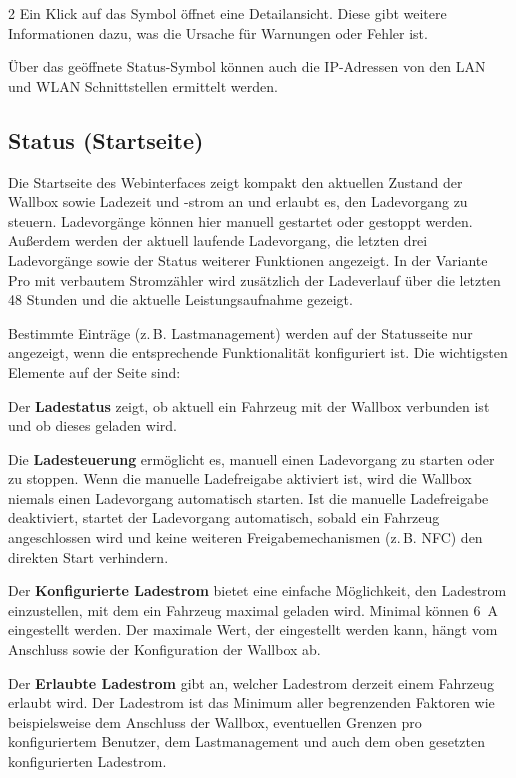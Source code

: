 \documentclass[a4paper,10pt]{article}
\newcommand{\hint}[1]{\begin{tcolorbox}[colback=boxgray,colframe=black,coltext=
white,title=Hinweis,left*=2mm,right*=2mm,boxsep=1mm,bottom=1mm,top=1mm]#1\end{tcolorbox}}
\begin{document}
\begin{multicols*}{2}
	Ein Klick auf das Symbol öffnet eine Detailansicht. Diese gibt weitere
	Informationen dazu, was die Ursache für Warnungen oder Fehler ist.
	\par
	\hint{Über das geöffnete Status-Symbol können auch die IP-Adressen von den LAN und
	WLAN Schnittstellen ermittelt werden.}

    \subsection{Status (Startseite)}

    Die Startseite des Webinterfaces zeigt kompakt den aktuellen Zustand der
    Wallbox sowie Ladezeit und -strom an und erlaubt es, den Ladevorgang zu steuern.
    Ladevorgänge können hier manuell gestartet oder gestoppt werden.
    Außerdem werden der aktuell laufende Ladevorgang, die letzten drei
    Ladevorgänge sowie der Status weiterer Funktionen angezeigt.
    In der Variante Pro mit verbautem Stromzähler wird zusätzlich der Ladeverlauf
    über die letzten 48 Stunden und die aktuelle Leistungsaufnahme gezeigt.

    Bestimmte Einträge (z.\,B. Lastmanagement) werden auf der Statusseite nur angezeigt, wenn die entsprechende
    Funktionalität konfiguriert ist. Die wichtigsten Elemente auf der Seite sind:

    Der \textbf{Ladestatus} zeigt, ob aktuell ein
    Fahrzeug mit der Wallbox verbunden ist und ob dieses geladen wird.

    Die \textbf{Ladesteuerung} ermöglicht es, manuell einen Ladevorgang zu
    starten oder zu stoppen. Wenn die manuelle Ladefreigabe aktiviert ist, wird die
    Wallbox niemals einen Ladevorgang automatisch starten.
    Ist die manuelle Ladefreigabe deaktiviert,
    startet der Ladevorgang automatisch, sobald ein Fahrzeug
    angeschlossen wird und keine weiteren Freigabemechanismen (z.\,B. NFC) den
    direkten Start verhindern.

    Der \textbf{Konfigurierte Ladestrom} bietet eine einfache Möglichkeit, den
	Ladestrom einzustellen, mit dem ein Fahrzeug maximal geladen wird.
	Minimal können \SI{6}{\ampere} eingestellt werden. Der maximale Wert, der eingestellt werden kann, hängt vom Anschluss sowie der Konfiguration der Wallbox ab.

    Der \textbf{Erlaubte Ladestrom} gibt an, welcher Ladestrom derzeit einem Fahrzeug erlaubt
    wird. Der Ladestrom ist das Minimum aller begrenzenden Faktoren wie
    beispielsweise dem Anschluss der Wallbox, eventuellen Grenzen pro konfiguriertem Benutzer,
    dem Lastmanagement und auch dem oben gesetzten konfigurierten Ladestrom.


\end{multicols*}
\end{document}
